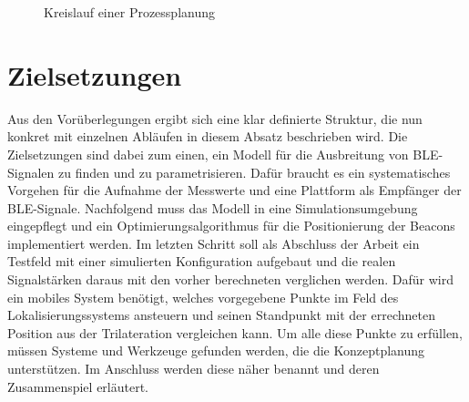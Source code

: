 \begin{figure}[H]
\centering
{}
\caption{Kreislauf einer Prozessplanung}
\label{fig:Prozessplanung}
\end{figure}
\section{Zielsetzungen}
Aus den Vorüberlegungen ergibt sich eine klar definierte Struktur, die nun konkret mit einzelnen Abläufen in diesem Absatz beschrieben wird. Die Zielsetzungen sind dabei zum einen, ein Modell für die Ausbreitung von BLE-Signalen zu finden und zu parametrisieren. Dafür braucht es ein systematisches Vorgehen für die Aufnahme der Messwerte und eine Plattform als Empfänger der BLE-Signale. Nachfolgend muss das Modell in eine Simulationsumgebung eingepflegt und ein Optimierungsalgorithmus für die Positionierung der Beacons implementiert werden. Im letzten Schritt soll als Abschluss der Arbeit ein Testfeld mit einer simulierten Konfiguration aufgebaut und die realen Signalstärken daraus mit den vorher berechneten verglichen werden. Dafür wird ein mobiles System benötigt, welches vorgegebene Punkte im Feld des Lokalisierungssystems ansteuern und seinen Standpunkt mit der errechneten Position aus der Trilateration vergleichen kann. Um alle diese Punkte zu erfüllen, müssen Systeme und Werkzeuge gefunden werden, die die Konzeptplanung unterstützen. Im Anschluss werden diese näher benannt und deren Zusammenspiel erläutert.
